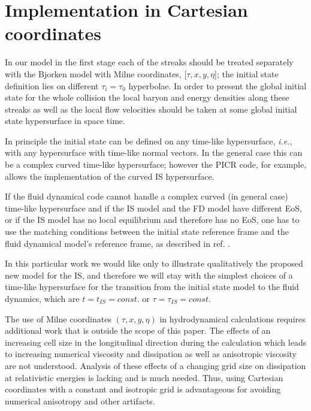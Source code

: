 \documentclass[aps,prc,twocolumn,floatfix,showpacs,a4paper,
nofootinbib,amsmath,amssymb]{revtex4-1}
\begin{document}
\section{Implementation in Cartesian coordinates}


In our model in the first stage each of the streaks should be treated separately with the Bjorken model with Milne coordinates, [$\tau, x,y,\eta$];  
the initial state definition lies on different $\tau_i = \tau_0$ hyperbolae. 
In order to present the global initial state for the whole collision the local baryon and energy densities along these streaks as well as the
local flow velocities should be taken at some global initial state hypersurface in space time. 


In principle the initial state can be defined on any time-like hypersurface,
{\it i.e.}, with any hypersurface with time-like normal vectors.  
In the general case this can be a complex curved time-like hypersurface; however the PICR code, for example, allows the 
implementation of the curved IS hypersurface. 

If the fluid dynamical code cannot handle a complex curved (in general case) time-like hypersurface 
and if the IS model and the FD model have different EoS, or if the IS model has no local equilibrium and therefore
has no EoS,
one has to use the matching conditions between the initial state
reference frame and the fluid dynamical model's reference frame,
as described in ref. \cite{Cheng2010}.



In this particular work we would like only to illustrate qualitatively the proposed new model for the IS, and therefore we will stay with the simplest choices of a time-like hypersurface for the transition 
from the initial state model to the fluid dynamics, which are $t=t_{IS}=const.$ or  $\tau=\tau_{IS}=const.$ 



The use of  Milne  coordinates $(\tau, x, y,\eta)$ in hydrodynamical calculations  requires additional work that is outside the scope of this paper.
The  effects of an increasing cell size 
in the longitudinal direction during the calculation which leads to 
increasing numerical viscosity and dissipation as well as anisotropic
viscosity are not understood.  Analysis of these effects of a changing grid size on dissipation at relativistic energies is lacking and is much needed.
Thus, using Cartesian coordinates with a constant and isotropic grid
is advantageous for avoiding numerical anisotropy and other artifacts.
\end{document}
